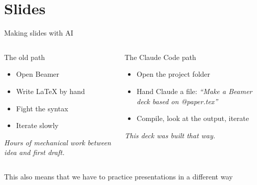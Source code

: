 \documentclass[aspectratio=169, 10pt]{beamer}
\begin{document}
\section{Slides}
\sourceline{}

\begin{frame}{Making slides with AI}
\vskip0.2cm
\begin{columns}[t]
\begin{mckcard}[mckgrey]{The old path}
\footnotesize
\begin{itemize}
  \item Open Beamer
  \item Write LaTeX by hand
  \item Fight the syntax
  \item Iterate slowly
\end{itemize}
\medskip
\textit{\textcolor{mckgrey}{Hours of mechanical work between idea and first draft.}}
\end{mckcard}

\begin{mckcard}[mckblue]{The Claude Code path}
\footnotesize
\begin{itemize}
  \item Open the project folder
  \item Hand Claude a file: \textit{``Make a Beamer deck based on @paper.tex''}
  \item Compile, look at the output, iterate
\end{itemize}
\medskip
\textit{\textcolor{mckblue}{This deck was built that way.}}
\end{mckcard}
\end{columns}

\vskip0.4cm
\begin{sowhat}
This also means that we have to practice presentations in a different way
\end{sowhat}
\end{frame}
\end{document}
